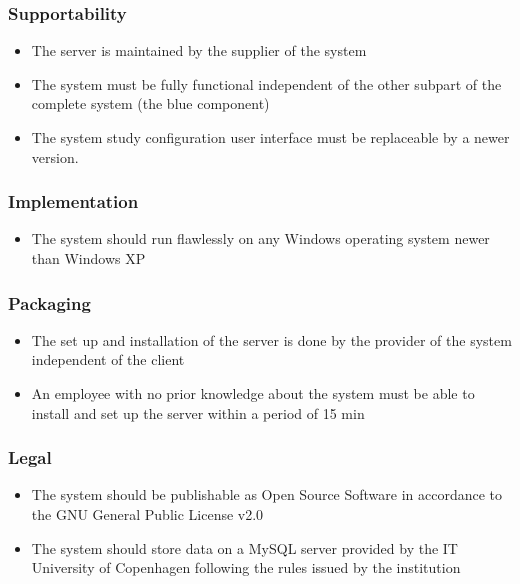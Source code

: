 \subsubsection{Supportability}

\begin{itemize}
\item The server is maintained by the supplier of the system
\item The system must be fully functional independent of the other subpart of the complete system (the blue component)
\item The system study configuration user interface must be replaceable by a newer version.
\end{itemize}

\subsubsection{Implementation}

\begin{itemize}
\item The system should run flawlessly on any Windows operating system newer than Windows XP
\end{itemize}

\subsubsection{Packaging}

\begin{itemize}
\item The set up and installation of the server is done by the provider of the system independent of the client
\item An employee with no prior knowledge about the system must be able to install and set up the server within a period of 15 min
\end{itemize}

\subsubsection{Legal}

\begin{itemize}
\item The system should be publishable as Open Source Software in accordance to the GNU General Public License v2.0
\item The system should store data on a MySQL server provided by the IT University of Copenhagen following the rules issued by the institution
\end{itemize}

